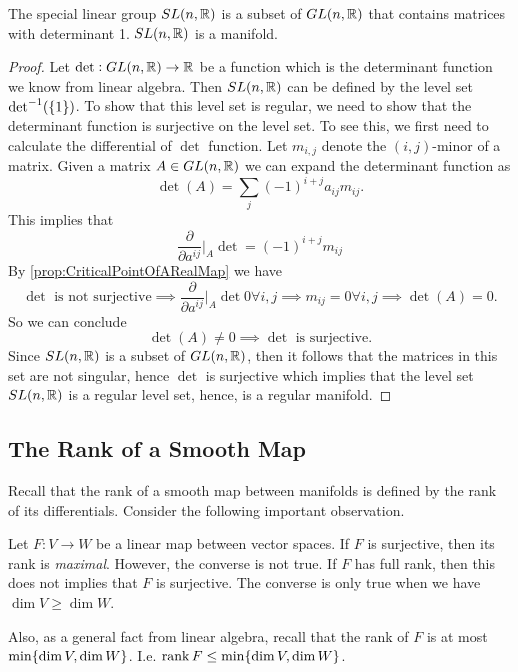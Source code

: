 \begin{proposition}
	The special linear group $ SL(n,\mathbb{R}) $ is a subset of $ GL(n,\mathbb{R}) $ that contains matrices with determinant 1. $ SL(n,\mathbb{R}) $ is a manifold.
\end{proposition}
\begin{proof}
	Let $ \det: GL(n,\mathbb{R}) \to \mathbb{R} $ be a function which is the determinant function we know from linear algebra. Then $ SL(n,\mathbb{R}) $ can be defined by the level set $ \det^{-1}(\{1\}) $. To show that this level set is regular, we need to show that the determinant function is surjective on the level set. To see this, we first need to calculate the differential of $ \det $ function. Let $ m_{i,j} $ denote the $ (i,j)\text{-minor} $ of a matrix. Given a matrix $ A \in GL(n,\mathbb{R}) $ we can expand the determinant function as
	\[ \det(A) = \sum_j (-1)^{i+j} a_{ij} m_{ij}. \]
	This implies that 
	\[ \frac{\partial}{\partial  a^{ij}}\big|_{A} \det = (-1)^{i+j} m_{ij} \]
	By \autoref{prop:CriticalPointOfARealMap} we have
	\[ \det\text{ is not surjective} \implies \frac{\partial}{\partial  a^{ij}}\big|_{A} \det 0 \forall i,j \implies m_{ij}=0 \forall i,j \implies \det(A)=0. \]
	So we can conclude 
	\[ \det(A) \neq 0 \implies \det\text{ is surjective}. \]
	Since $ SL(n,\mathbb{R}) $ is a subset of $ GL(n,\mathbb{R}) $, then it follows that the matrices in this set are not singular, hence $ \det $ is surjective which implies that the level set $ SL(n,\mathbb{R}) $  is a regular level set, hence, is a regular manifold.
\end{proof}


\subsection{The Rank of a Smooth Map}
Recall that the rank of a smooth map between manifolds is defined by the rank of its differentials. Consider the following important observation.

\begin{observation}
	Let $ F: V \to W $ be a linear map between vector spaces. If $ F $ is surjective, then its rank is \emph{maximal}. However, the converse is not true. If $ F $ has full rank, then this does not implies that $ F $ is surjective. The converse is only true when we have $ \dim V \geq \dim W $.
	
	Also, as a general fact from linear algebra, recall that the rank of $ F $ is at most $ \min\{\dim V, \dim W\} $. I.e.  $ \rank F \leq \min\{\dim V, \dim W\} $.
\end{observation}

